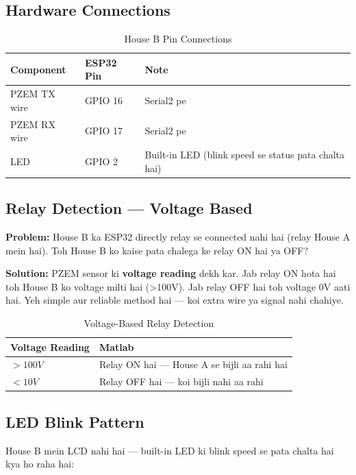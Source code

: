 \subsection{Hardware Connections}

\begin{table}[H]
\centering
\begin{tabular}{l l l}
\toprule
\textbf{Component} & \textbf{ESP32 Pin} & \textbf{Note} \\
\midrule
PZEM TX wire & GPIO 16 & Serial2 pe \\
PZEM RX wire & GPIO 17 & Serial2 pe \\
LED & GPIO 2 & Built-in LED (blink speed se status pata chalta hai) \\
\bottomrule
\end{tabular}
\caption{House B Pin Connections}
\end{table}

\subsection{Relay Detection --- Voltage Based}

\textbf{Problem:} House B ka ESP32 directly relay se connected nahi hai (relay House A mein hai). Toh House B ko kaise pata chalega ke relay ON hai ya OFF?

\textbf{Solution:} PZEM sensor ki \textbf{voltage reading} dekh kar. Jab relay ON hota hai toh House B ko voltage milti hai (\textgreater100V). Jab relay OFF hai toh voltage 0V aati hai. Yeh simple aur reliable method hai --- koi extra wire ya signal nahi chahiye.

\begin{table}[H]
\centering
\begin{tabular}{l l}
\toprule
\textbf{Voltage Reading} & \textbf{Matlab} \\
\midrule
$> 100V$ & Relay ON hai --- House A se bijli aa rahi hai \\
$< 10V$ & Relay OFF hai --- koi bijli nahi aa rahi \\
\bottomrule
\end{tabular}
\caption{Voltage-Based Relay Detection}
\end{table}

\subsection{LED Blink Pattern}

House B mein LCD nahi hai --- built-in LED ki blink speed se pata chalta hai kya ho raha hai:

